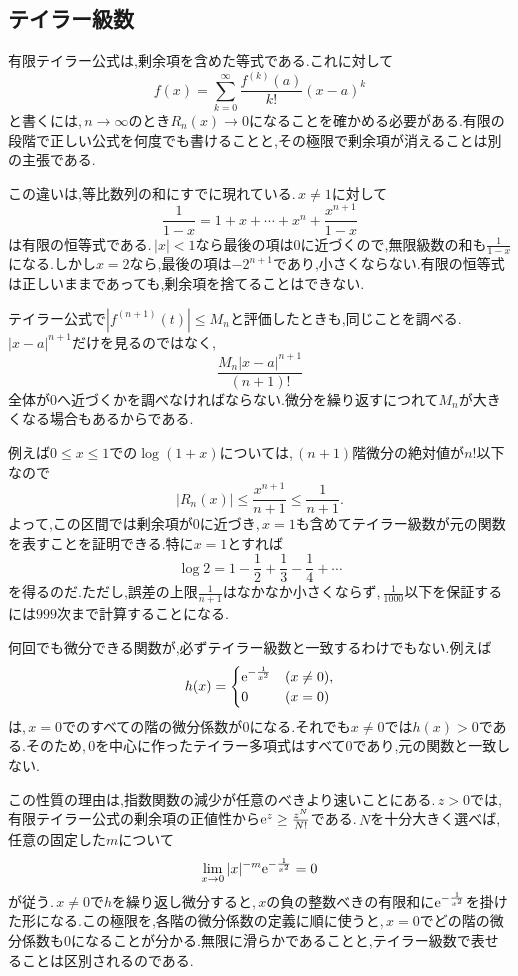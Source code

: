\subsection{テイラー級数}

有限テイラー公式は,剰余項を含めた等式である.これに対して
\[
 f(x)=\sum_{k=0}^{\infty}\frac{f^{(k)}(a)}{k!}(x-a)^k
\]
と書くには,\,$n\to\infty$のとき$R_n(x)\to0$になることを確かめる必要がある.有限の段階で正しい公式を何度でも書けることと,その極限で剰余項が消えることは別の主張である.

この違いは,等比数列の和にすでに現れている.\,$x\ne1$に対して
\[
 \frac1{1-x}=1+x+\cdots+x^n+\frac{x^{n+1}}{1-x}
\]
は有限の恒等式である.\,$|x|<1$なら最後の項は$0$に近づくので,無限級数の和も$\frac1{1-x}$になる.しかし$x=2$なら,最後の項は$-2^{n+1}$であり,小さくならない.有限の恒等式は正しいままであっても,剰余項を捨てることはできない.

テイラー公式で$|f^{(n+1)}(t)|\le M_n$と評価したときも,同じことを調べる.\,$|x-a|^{n+1}$だけを見るのではなく,
\[
 \frac{M_n|x-a|^{n+1}}{(n+1)!}
\]
全体が$0$へ近づくかを調べなければならない.微分を繰り返すにつれて$M_n$が大きくなる場合もあるからである.

例えば$0\le x\le1$での$\log(1+x)$については,\,$(n+1)$階微分の絶対値が$n!$以下なので
\[
 |R_n(x)|\le\frac{x^{n+1}}{n+1}\le\frac1{n+1}.
\]
よって,この区間では剰余項が$0$に近づき,\,$x=1$も含めてテイラー級数が元の関数を表すことを証明できる.特に$x=1$とすれば
\[
 \log2=1-\frac12+\frac13-\frac14+\cdots
\]
を得るのだ.ただし,誤差の上限$\frac1{n+1}$はなかなか小さくならず,\,$\frac1{1000}$以下を保証するには$999$次まで計算することになる.

\begin{note}
何回でも微分できる関数が,必ずテイラー級数と一致するわけでもない.例えば
\[
 h(x)=
 \begin{cases}
  \mathrm{e}^{-\frac1{x^2}}&(x\ne0),\\
  0&(x=0)
 \end{cases}
\]
は,\,$x=0$でのすべての階の微分係数が$0$になる.それでも$x\ne0$では$h(x)>0$である.そのため,\,$0$を中心に作ったテイラー多項式はすべて$0$であり,元の関数と一致しない.

この性質の理由は,指数関数の減少が任意のべきより速いことにある.\,$z>0$では,有限テイラー公式の剰余項の正値性から$\mathrm{e}^z\ge\frac{z^N}{N!}$である.\,$N$を十分大きく選べば,任意の固定した$m$について
\[
 \lim_{x\to0}|x|^{-m}\mathrm{e}^{-\frac1{x^2}}=0
\]
が従う.\,$x\ne0$で$h$を繰り返し微分すると,\,$x$の負の整数べきの有限和に$\mathrm{e}^{-\frac1{x^2}}$を掛けた形になる.この極限を,各階の微分係数の定義に順に使うと,\,$x=0$でどの階の微分係数も$0$になることが分かる.無限に滑らかであることと,テイラー級数で表せることは区別されるのである.
\end{note}



